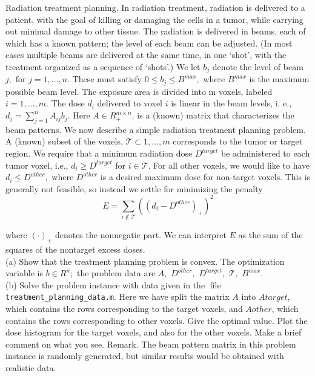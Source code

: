 \documentclass{article}
\begin{document}
Radiation treatment planning. In radiation treatment, radiation is delivered to a patient, with the
goal of killing or damaging the cells in a tumor, while carrying out minimal damage to other tissue.
The radiation is delivered in beams, each of which has a known pattern; the level of each beam can
be adjusted. (In most cases multiple beams are delivered at the same time, in one `shot', with the
treatment organized as a sequence of `shots'.) We let $b_j$ denote the level of beam $j,$ for $j = 1,\dots,n.$
These must satisfy $0 \leq b_j \leq B^{max},$ where $B^{max}$ is the maximum possible beam level. The exposure
area is divided into m voxels, labeled $i = 1,\dots,m.$ The dose $d_i$ delivered to voxel $i$ is linear in the beam levels, i. e., $d_j = \sum_{j=1}^n A_{ij}b_j.$
Here $A \in R_{+}^{m \times n}.$ is a (known) matrix
that characterizes the beam patterns. We now describe a simple radiation treatment planning problem. A (known) subset of the voxels, $\mathcal{T} \subset {1,\dots ,m}$
corresponds to the tumor or target region. We
require that a minimum radiation dose $D^{target}$ be administered to each tumor voxel, i.e., 
$d_i \geq D^{target}$ for $i \in \mathcal{T}.$ For all other voxels, we would like to have $d_i \leq D^{other},$ 
where $D^{other}$ is a desired maximum dose for non-target voxels. This is generally not feasible, so instead we settle for minimizing the penalty
$$
E = \sum_{i \notin \mathcal{T}}((d_i - D^{other})_{+})^2
$$

where $(\cdot)_+$ denotes the nonnegatie part. We can interpret $E$ as the sum of the squares of the
nontarget excess doses. \\

(a) Show that the treatment planning problem is convex. The optimization variable is $b \in R^n;$ the problem data are $A,$ $D^{other},$ $D^{target},$ $\mathcal{T},$
$B^{max}.$ \\

(b) Solve the problem instance with data given in the file \verb!treatment_planning_data.m!. Here we
have split the matrix $A$ into $Atarget$, which contains the rows corresponding to the target
voxels, and $Aother$, which contains the rows corresponding to other voxels. Give the optimal
value. Plot the dose histogram for the target voxels, and also for the other voxels. Make a
brief comment on what you see. Remark. The beam pattern matrix in this problem instance
is randomly generated, but similar results would be obtained with realistic data.
\end{document}
